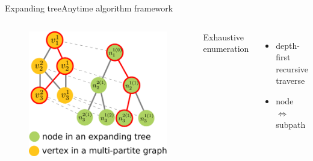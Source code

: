 \begin{frame}{Expanding tree}{Anytime algorithm framework}
	
	\begin{columns}
		
		\begin{minipage}{\textwidth}
			\begin{figure}
				\centering
				\includegraphics[width=.9\textwidth]{./figure/multipartite_expandingtree}
			\end{figure}
		\end{minipage}
		
		
		\begin{minipage}{\textwidth}
			
			Exhaustive enumeration
			
			\begin{itemize}
				\item depth-first recursive traverse
				\item node $ \Longleftrightarrow $ subpath
			\end{itemize}
		\end{minipage}
		
	\end{columns}
	
\end{frame}

